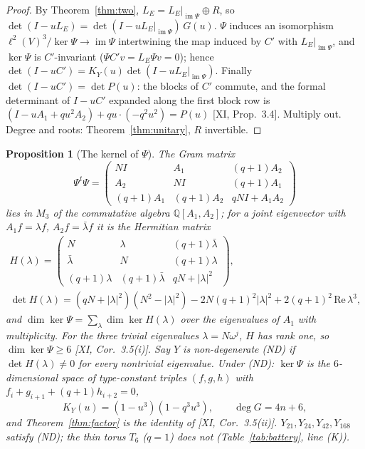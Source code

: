 \documentclass[11pt]{amsart}
\numberwithin{equation}{section}
\newtheorem{proposition}[theorem]{Proposition}
\theoremstyle{definition}
\theoremstyle{remark}
\newcommand{\Q}{\mathbb{Q}}
\newcommand{\LE}{L_E}
\newcommand{\im}{\operatorname{im}}
\begin{document}
\begin{proof}
By Theorem~\ref{thm:two}, $\LE=\LE|_{\im\Psi}\oplus R$, so $\det(I-u\LE)=\det(I-u\LE|_{\im\Psi})
\,G(u)$. $\Psi$ induces an isomorphism $\ell^{2}(V)^{3}/\ker\Psi\to\im\Psi$ intertwining the
map induced by $C'$ with $\LE|_{\im\Psi}$, and $\ker\Psi$ is $C'$-invariant ($\Psi C'v=\LE\Psi v=0$);
hence $\det(I-uC')=K_Y(u)\det(I-u\LE|_{\im\Psi})$. Finally $\det(I-uC')=\det P(u)$: the blocks
of $C'$ commute, and the formal determinant of $I-uC'$ expanded along the first block row is
$(I-uA_1+qu^{2}A_2)+qu\cdot(-q^{2}u^{2})=P(u)$ [XI, Prop.~3.4]. Multiply out. Degree and
roots: Theorem~\ref{thm:unitary}, $R$ invertible.
\end{proof}

\begin{proposition}[The kernel of $\Psi$]\label{prop:kernel}
The Gram matrix
\[
\Psi^{t}\Psi=\begin{pmatrix}NI&A_1&(q{+}1)A_2\\A_2&NI&(q{+}1)A_1\\(q{+}1)A_1&(q{+}1)A_2&qNI+A_1A_2\end{pmatrix}
\]
lies in $M_3$ of the commutative algebra $\Q[A_1,A_2]$; for a joint eigenvector with
$A_1f=\lambda f$, $A_2f=\bar\lambda f$ it is the Hermitian matrix
\begin{gather*}
H(\lambda)=\begin{pmatrix}N&\lambda&(q{+}1)\bar\lambda\\\bar\lambda&N&(q{+}1)\lambda\\
(q{+}1)\lambda&(q{+}1)\bar\lambda&qN+|\lambda|^{2}\end{pmatrix},\\
\det H(\lambda)=(qN+|\lambda|^{2})(N^{2}-|\lambda|^{2})-2N(q{+}1)^{2}|\lambda|^{2}+2(q{+}1)^{2}\,\mathrm{Re}\,\lambda^{3},
\end{gather*}
and $\dim\ker\Psi=\sum_\lambda\dim\ker H(\lambda)$ over the eigenvalues of $A_1$ with
multiplicity. For the three trivial eigenvalues $\lambda=N\omega^{j}$, $H$ has rank one, so
$\dim\ker\Psi\ge6$ [XI, Cor.~3.5(i)]. Say $Y$ is \emph{non-degenerate} (ND) if $\det H(\lambda)\ne0$
for every nontrivial eigenvalue. Under (ND): $\ker\Psi$ is the $6$-dimensional space of
type-constant triples $(f,g,h)$ with $f_i+g_{i+1}+(q{+}1)h_{i+2}=0$,
\[
K_Y(u)=(1-u^{3})(1-q^{3}u^{3}),\qquad \deg G=4n+6 ,
\]
and Theorem~\ref{thm:factor} is the identity of {\rm[XI, Cor.~3.5(ii)]}. $Y_{21},Y_{24},Y_{42},
Y_{168}$ satisfy (ND); the thin torus $T_6$ ($q=1$) does not (Table~\ref{tab:battery}, line (K)).
\end{proposition}
\end{document}
